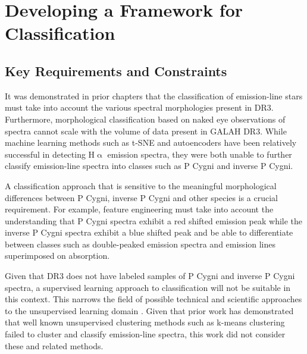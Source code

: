 \chapter{Developing a Framework for Classification}

\section{Key Requirements and Constraints}

It was demonstrated in prior chapters that the classification of emission-line stars must take into account the various spectral morphologies present in DR3. Furthermore, morphological classification based on naked eye observations of spectra cannot scale with the volume of data present in GALAH DR3. While machine learning methods such as t-SNE and autoencoders \cite{traven2017galah,vcotar2021galah} have been relatively successful in detecting H$\upalpha$ emission spectra, they were both unable to further classify emission-line spectra into classes such as P Cygni and inverse P Cygni.

A classification approach that is sensitive to the meaningful morphological differences between P Cygni, inverse P Cygni and other species is a crucial requirement. For example, feature engineering must take into account the understanding that P Cygni spectra exhibit a red shifted emission peak while the inverse P Cygni spectra exhibit a blue shifted peak and be able to differentiate between classes such as double-peaked emission spectra and emission lines superimposed on absorption.

Given that DR3 does not have labeled samples of P Cygni and inverse P Cygni spectra, a supervised learning approach to classification will not be suitable in this context. This narrows the field of possible technical and scientific approaches to the unsupervised learning domain \cite{hastie2009elements}. Given that prior work has demonstrated that well known unsupervised clustering methods such as k-means clustering failed to cluster and classify emission-line spectra, this work did not consider these and related methods. 

